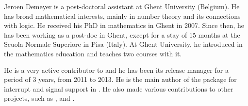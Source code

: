 \begin{participant}[type=leadPI,PM=32.5,gender=male]{Jeroen Demeyer}
is a post-doctoral assistant at Ghent University (Belgium).
He has broad mathematical interests, mainly in number theory and its
connections with logic.
He received his PhD in mathematics in Ghent in 2007.
Since then, he has been working as a post-doc in Ghent,
except for a stay of 15 months at the Scuola Normale Superiore in Pisa (Italy).
At Ghent University, he introduced \Sage{} in the mathematics education
and teaches two courses with it.

He is a very active contributor to \Sage{} and he has been its
release manager for a period of 3 years, from 2011 to 2013.
He is the main author of the  package
for interrupt and signal support in \Cython{}.
He also made various contributions to other projects,
such as \PariGP{}, \Cython{} and \Jupyter{}.
\end{participant}

